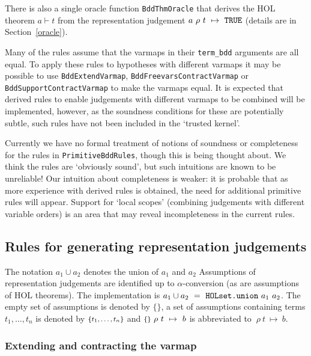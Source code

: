 \documentclass[12pt]{article}
\renewcommand{\t}[1]{\mbox{\tt #1}}
\newcommand{\ml}[1]{{\tt #1}}
\newcommand{\termbdd}[4]{\mbox{$#1~#2~#3~\mapsto~#4$}}
\newcommand{\emptyass}{\mbox{\footnotesize$\{\xspace\}$}\xspace}
\newcommand{\setass}[1]{\mbox{\footnotesize$\{#1\}$}\xspace}
\newcommand\termbddty{\texttt{term\_bdd}\xspace}
\begin{document}
There is also a single oracle function
\t{BddThmOracle} that derives the HOL theorem $a \vdash t$
from the representation judgement \termbdd{a}{\rho}{t}{\ml{TRUE}}
(details are in Section~\ref{oracle}).

Many of the rules assume that the varmaps in their \termbddty
arguments are all equal. To apply these rules to hypotheses with
different varmaps it may be possible to use \t{BddExtendVarmap},
\t{BddFreevarsContractVarmap} or \t{BddSupportContractVarmap} to make
the varmaps equal.  It is expected that derived rules to enable
judgements with different varmaps to be combined will be implemented,
however, as the soundness conditions for these are potentially subtle,
such rules have not been included in the `trusted kernel'.

Currently we have no formal treatment of notions of soundness or
completeness for the rules in \t{PrimitiveBddRules}, though this is
being thought about. We think the rules are `obviously sound', but
such intuitions are known to be unreliable! Our intuition about
completeness is weaker: it is probable that as more experience with
derived rules is obtained, the need for additional primitive rules
will appear. Support for `local scopes' (combining judgements with
different variable orders) is an area that may reveal incompleteness
in the current rules.

\subsection{Rules for generating representation judgements}\label{term-bdd-rules}

The notation $a_1 \cup a_2$ denotes the union of $a_1$ and $a_2$ 
Assumptions of
representation judgements are identified up to $\alpha$-conversion (as
are assumptions of HOL theorems).
The implementation is $a_1 \cup a_2~=~\t{HOLset.union}~a_1~a_2$. 
The empty set of assumptions is denoted by \emptyass, a set of
assumptions containing terms $t_1, \ldots ,t_n$ is denoted by
$\setass{t_1, \ldots ,t_n}$  and 
$\termbdd{\emptyass}{\rho}{t}{b}$ is abbreviated to
$\termbdd{}{\rho}{t}{b}$.


\subsubsection*{Extending and contracting the varmap}
\end{document}
